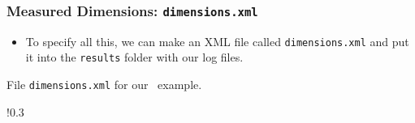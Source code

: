 \begin{frame}
\frametitle{Measured Dimensions: \texttt{dimensions.xml}}%
%
\begin{itemize}%
\item To specify all this, we can make an XML file called \texttt{dimensions.xml} and put it into the \texttt{results} folder with our log files.%
\end{itemize}%
%
\begin{locateBox}{0.025}{0.235}
\begin{listingblock}[0.95\paperwidth]{File \texttt{dimensions.xml} for our \maxSat\ example.}
\centering
\begin{scaledBox}{!}{0.3\paperheight}
\parbox{1.25\paperwidth}{%

}%
\end{scaledBox}
\end{listingblock}
\end{locateBox}
%
\end{frame}
%
%
